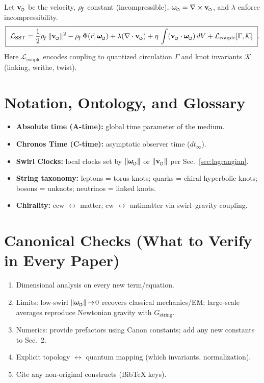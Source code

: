 \documentclass[11pt]{article}
\begin{document}
    Let $\vswirl$ be the velocity, $\rho_{\!f}$ constant (incompressible), $\omegas=\nabla\times\vswirl$, and $\lambda$ enforce incompressibility.
    \[
        \boxed{\
        \mathcal{L}_{\text{SST}} =
            \frac{1}{2}\rhof\,\lVert\vswirl\rVert^{2}
            - \rhof\,\Phi(\vec r,\omegas)
            + \lambda(\nabla\cdot\vswirl)
            + \eta\,\int (\vswirl\cdot\omegas)\,dV
            + \mathcal{L}_{\text{couple}}[\Gamma,\mathcal{K}]
            \ }.
    \]
    Here $\mathcal{L}_{\text{couple}}$ encodes coupling to quantized circulation $\Gamma$ and knot invariants $\mathcal{K}$ (linking, writhe, twist).

    \section{Notation, Ontology, and Glossary}
    \begin{itemize}
        \item \textbf{Absolute time (A-time):} global time parameter of the medium.
        \item \textbf{Chronos Time (C-time):} asymptotic observer time ($dt_{\infty}$).
        \item \textbf{Swirl Clocks:} local clocks set by \(\lVert\omegas\rVert\) or \(\lVert\vswirl\rVert\) per Sec.~\ref{sec:lagrangian}.
        \item \textbf{String taxonomy:} leptons = torus knots; quarks = chiral hyperbolic knots; bosons = unknots; neutrinos = linked knots.
        \item \textbf{Chirality:} ccw $\leftrightarrow$ matter; cw $\leftrightarrow$ antimatter via swirl–gravity coupling.
    \end{itemize}

    \section{Canonical Checks (What to Verify in Every Paper)}
    \begin{enumerate}
        \item Dimensional analysis on every new term/equation.
        \item Limits: low-swirl \(\lVert\omegas\rVert\!\to\!0\) recovers classical mechanics/EM; large-scale averages reproduce Newtonian gravity with \(G_{\text{string}}\).
        \item Numerics: provide prefactors using Canon constants; add any new constants to Sec.~2.
        \item Explicit topology \(\leftrightarrow\) quantum mapping (which invariants, normalization).
        \item Cite any non-original constructs (BibTeX keys).
    \end{enumerate}
\end{document}
